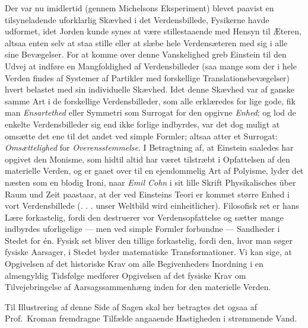 \documentclass[12pt,a4paper]{article}
\newcommand{\opage}[1]{\marginnote{\footnotesize\textit{[#1]}}}
\begin{document}
Der var nu imidlertid (gennem Michelsons Eksperiment) blevet paavist en
tilsyneladende uforklarlig Skævhed i det Verdensbillede, Fysikerne havde
udformet, idet Jorden kunde synes at være stillestaaende med Hensyn til
Æteren, altsaa enten selv at staa stille eller at slæbe hele Verdensæteren med
sig i alle sine Bevægelser. For at komme over denne Vanskelighed greb Einstein
til den Udvej at indføre en Mangfoldighed af Verdensbilleder (saa mange som der
i hele Verden findes af Systemer af Partikler med forskellige
Translationsbevægelser) hvert belastet med sin individuelle Skævhed. Idet denne
Skævhed var af ganske samme Art i de forskellige Verdensbilleder, som alle
erklæredes for lige gode, fik man \emph{Ensartethed} eller Symmetri som
Surrogat for den opgivne \emph{Enhed}; og lod de enkelte Verdensbilleder sig
end ikke forlige indbyrdes, var det dog muligt at omsætte det ene til det andet
ved simple Formler; altsaa atter et Surrogat: \emph{Omsættelighed} for
\emph{Overensstemmelse}. I Betragtning af, at Einstein saaledes har opgivet den
Monisme, som hidtil altid har været tilstræbt i Opfattelsen af den materielle
Verden, og er gaaet over til en ejendommelig Art af \guillemotright
Polyisme\guillemotleft, lyder det næsten som en blodig Ironi, naar \emph{Emil
Cohn} i sit lille Skrift \guillemotright Physikalisches über Raum und
Zeit\guillemotleft{} paastaar, at der ved Einsteins
\opage{8} Teori er kommet større Enhed i vort Verdensbillede (\guillemotright . . . unser
Weltbild wird einheitlicher\guillemotleft). Filosofisk set er hans Lære
forkastelig, fordi den destruerer vor Verdensopfattelse og sætter mange
indbyrdes uforligelige --- men ved simple Formler forbundne --- Sandheder i
Stedet for én. Fysisk set bliver den tillige forkastelig, fordi den, hvor man
søger fysiske Aarsager, i Stedet byder matematiske Transformationer. Vi kan
sige, at Opgivelsen af det historiske Krav om alle Begivenheders Inordning i en
almengyldig Tidsfølge medfører Opgivelsen af det fysiske Krav om
Tilvejebringelse af Aarsagssammenhæng inden for den materielle Verden.

Til Illustrering af denne Side af Sagen skal her betragtes det ogsaa af Prof.\
Kroman fremdragne Tilfælde angaaende Hastigheden i strømmende Vand.
\end{document}
